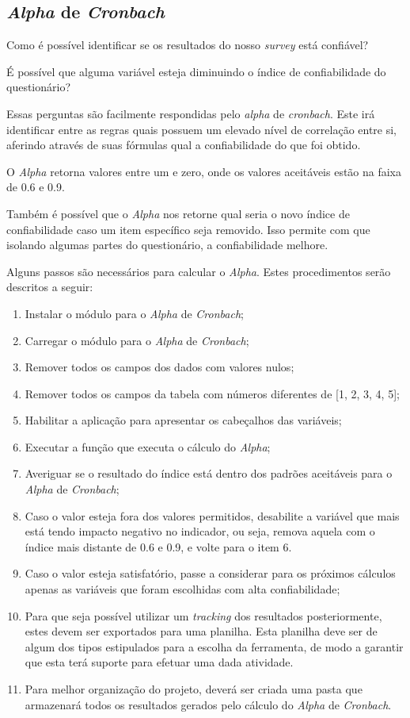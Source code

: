\subsection{\textit{Alpha} de \textit{Cronbach}}
\label{sub:alpha_de_cronbach}
Como é possível identificar se os resultados do nosso \textit{survey} está confiável?

É possível que alguma variável esteja diminuindo o índice de confiabilidade do questionário?

Essas perguntas são facilmente respondidas pelo \textit{alpha} de \textit{cronbach}. Este irá identificar entre as regras quais possuem
um elevado nível de correlação entre si, aferindo através de suas fórmulas qual a confiabilidade do que foi obtido.

O \textit{Alpha} retorna valores entre um e zero, onde os valores aceitáveis estão na faixa de 0.6 e 0.9.

Também é possível que o \textit{Alpha} nos retorne qual seria o novo índice de confiabilidade caso um item específico seja removido.
Isso permite com que isolando algumas partes do questionário, a confiabilidade melhore.

Alguns passos são necessários para calcular o \textit{Alpha}. Estes procedimentos serão descritos a seguir:

\begin{enumerate}
    \item Instalar o módulo para o \textit{Alpha} de \textit{Cronbach};
    \item Carregar o módulo para o \textit{Alpha} de \textit{Cronbach};
    \item Remover todos os campos dos dados com valores nulos;
    \item Remover todos os campos da tabela com números diferentes de [1, 2, 3, 4, 5];
    \item Habilitar a aplicação para apresentar os cabeçalhos das variáveis;
    \item Executar a função que executa o cálculo do \textit{Alpha};
    \item Averiguar se o resultado do índice está dentro dos padrões aceitáveis para o \textit{Alpha} de \textit{Cronbach};
    \item Caso o valor esteja fora dos valores permitidos, desabilite a variável que mais está tendo impacto negativo no indicador,
        ou seja, remova aquela com o índice mais distante de 0.6 e 0.9, e volte para o item 6.
    \item Caso o valor esteja satisfatório, passe a considerar para os próximos cálculos apenas as variáveis que foram
        escolhidas com alta confiabilidade;
    \item Para que seja possível utilizar um \textit{tracking} dos resultados posteriormente, estes devem ser exportados para uma planilha.
        Esta planilha deve ser de algum dos tipos estipulados para a escolha da ferramenta, de modo a garantir que esta terá suporte
        para efetuar uma dada atividade.
    \item Para melhor organização do projeto, deverá ser criada uma pasta que armazenará todos os resultados gerados pelo cálculo do \textit{Alpha}
        de \textit{Cronbach}.
\end{enumerate}


